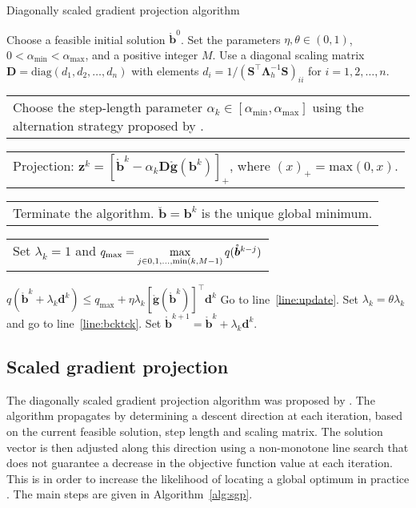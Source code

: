 \documentclass[twocolumn]{svjour3}
\makeatletter
\newcommand{\bS}{\bm{S}}
\newcommand*{\maxidx}{\operatornamewithlimits{max}\limits}
\newcommand{\myifthen}[1]{{\hspace{1.5cm}\algorithmicif} #1 \algorithmicthen}
\newcommand{\myifend}{\hspace{1.5cm}\algorithmicend \algorithmicindent {\scshape if}}
\newcommand{\myelse}{\hspace{1.5cm}\algorithmicelse}
\newcommand{\multiline}[1]{%
	\begin{tabularx}{\dimexpr\linewidth-\ALG@thistlm}[t]{@{}X@{}}
		#1
	\end{tabularx}
}
\makeatother
\begin{document}
\begin{algorithm*}
	\caption{Diagonally scaled gradient projection algorithm}
	\label{alg:sgp}
	\begin{spacing}{1.3}
		\begin{algorithmic}[1]
			\Require Choose a feasible initial solution $\mathring{\bm{b}}^{0}$. Set the parameters $\eta, \theta \in (0, 1)$, $0 < \alpha_{\text{min}} < \alpha_{\text{max}}$, and a positive integer $M$. Use a diagonal scaling matrix $\bm{D} = \text{diag}(d_1, d_2, \dots, d_n)$ with elements $d_i = 1 / (\bS^\top\bm{\Lambda}_h^{-1}\bS)_{ii}$ for $i = 1, 2, \dots, n$.
			\State\multiline{Choose the step-length parameter $\alpha_{k} \in [\alpha_{\text{min}}, \alpha_{\text{max}}]$ using the alternation strategy proposed by \citet{Bonettini2009}.}
			\State \multiline{Projection: $\bm{z}^{k} = [\mathring{\bm{b}}^{k} - \alpha_{k}\bm{D}\mathring{\bm{g}}(\bm{b}^{k})]_{+}$, where $(x)_+ = \text{max}(0, x)$.}
			\State \multiline{Terminate the algorithm. $\breve{\bm{b}} = \bm{b}^{k}$ is the unique global minimum.}
			\Else{}
			\State \multiline{Set $\lambda_{k} = 1$ and $q_{\text{max}} = \maxidx\limits_{j \in 0, 1, \dots, \textnormal{min}(k, M-1)}q(\mathring{\bm{b}}^{k-j})$} \vspace*{1.5mm}
			 \label{line:bcktck}
			\Statex \myifthen{$q(\mathring{\bm{b}}^{k} + \lambda_{k} \bm{d}^{k}) \leq q_{\text{max}} + \eta \lambda_{k} [\mathring{\bm{g}}(\mathring{\bm{b}}^{k})]^\top\bm{d}^{k}$}
			\Statex \hspace{2cm} Go to line~\ref{line:update}.
			\Statex \myelse {}
			\Statex \hspace{2cm} Set $\lambda_{k} = \theta \lambda_{k}$ and go to line~\ref{line:bcktck}.
			\Statex \myifend
			\State Set $\mathring{\bm{b}}^{k+1} = \mathring{\bm{b}}^{k} + \lambda_{k} \bm{d}^{k}$. \label{line:update}
			\EndIf
			\EndFor
		\end{algorithmic}
	\end{spacing}
\end{algorithm*}


\subsection{Scaled gradient projection}

The diagonally scaled gradient projection algorithm was proposed by \citet{Bonettini2009}. The algorithm propagates by determining a descent direction at each iteration, based on the current feasible solution, step length and scaling matrix. The solution vector is then adjusted along this direction using a non-monotone line search that does not guarantee a decrease in the objective function value at each iteration. This is in order to increase the likelihood of locating a global optimum in practice \citep{Birgin2003}. The main steps are given in Algorithm~\ref{alg:sgp}.
\end{document}
